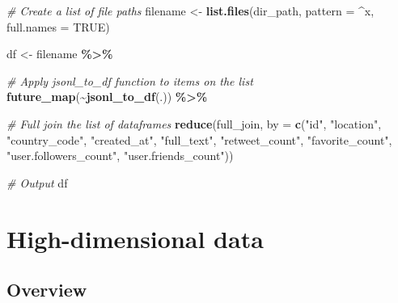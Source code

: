 \documentclass[
]{book}
\newenvironment{Shaded}{\begin{snugshade}}{\end{snugshade}}
\newcommand{\CommentTok}[1]{\textcolor[rgb]{0.56,0.35,0.01}{\textit{#1}}}
\newcommand{\DataTypeTok}[1]{\textcolor[rgb]{0.13,0.29,0.53}{#1}}
\newcommand{\KeywordTok}[1]{\textcolor[rgb]{0.13,0.29,0.53}{\textbf{#1}}}
\newcommand{\NormalTok}[1]{#1}
\newcommand{\OperatorTok}[1]{\textcolor[rgb]{0.81,0.36,0.00}{\textbf{#1}}}
\newcommand{\OtherTok}[1]{\textcolor[rgb]{0.56,0.35,0.01}{#1}}
\newcommand{\StringTok}[1]{\textcolor[rgb]{0.31,0.60,0.02}{#1}}
\begin{document}
\begin{Shaded}
\begin{Highlighting}[]
\CommentTok{\# Create a list of file paths }
\NormalTok{filename \textless{}{-}}\StringTok{ }\KeywordTok{list.files}\NormalTok{(dir\_path,}
          \DataTypeTok{pattern =} \StringTok{\textquotesingle{}\^{}x\textquotesingle{}}\NormalTok{,}
          \DataTypeTok{full.names =} \OtherTok{TRUE}\NormalTok{)}

\NormalTok{df \textless{}{-}}\StringTok{ }\NormalTok{filename }\OperatorTok{\%\textgreater{}\%}

\CommentTok{\# Apply jsonl\_to\_df function to items on the list}
\KeywordTok{future\_map}\NormalTok{(}\OperatorTok{\textasciitilde{}}\KeywordTok{jsonl\_to\_df}\NormalTok{(.)) }\OperatorTok{\%\textgreater{}\%}

\CommentTok{\# Full join the list of dataframes}
\KeywordTok{reduce}\NormalTok{(full\_join,}
       \DataTypeTok{by =} \KeywordTok{c}\NormalTok{(}\StringTok{"id"}\NormalTok{,}
              \StringTok{"location"}\NormalTok{,}
              \StringTok{"country\_code"}\NormalTok{,}
              \StringTok{"created\_at"}\NormalTok{,}
              \StringTok{"full\_text"}\NormalTok{,}
              \StringTok{"retweet\_count"}\NormalTok{,}
              \StringTok{"favorite\_count"}\NormalTok{,}
              \StringTok{"user.followers\_count"}\NormalTok{,}
              \StringTok{"user.friends\_count"}\NormalTok{))}

\CommentTok{\# Output}
\NormalTok{df}
\end{Highlighting}
\end{Shaded}

\hypertarget{machine_learning}{%
\chapter{High-dimensional data}\label{machine_learning}}

\hypertarget{overview}{%
\section{Overview}\label{overview}}
\end{document}
